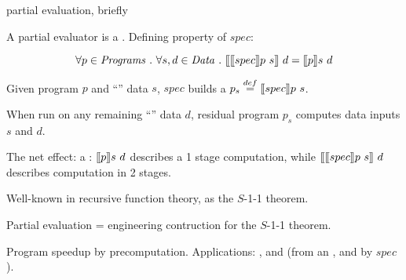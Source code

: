 \documentclass[12pt,fleqn,landscape]{article}
\begin{document}
\begin{slide}{partial evaluation, briefly}

A partial evaluator is a . Defining property of $spec$:

$$
\forall p\in \mathit{Programs}\ .\ \forall s, d \in \mathit{Data}\ . \ 
\lsem \lsem spec\rsem p\ s\rsem\ d = \lsem p\rsem s \ d
$$
\smallskip

\bi

\item Given program $p$ and ``'' data $s$, $\mathit{spec}$ builds a  $p_s \stackrel{def}{=} \mbox{$\lbrack\hspace{-0.3ex}\lbrack$} spec\mbox{$\rbrack\hspace{-0.3ex}\rbrack$} p\ s$. 

\item When run on any remaining ``'' data $d$, residual program $p_s$ computes  data inputs $s$ and $d$.

\item The net effect: a :  $\lsem p\rsem s \ d$ describes a 1 stage computation, while $\mbox{$\lbrack\hspace{-0.3ex}\lbrack$} \mbox{$\lbrack\hspace{-0.3ex}\lbrack$} spec\mbox{$\rbrack\hspace{-0.3ex}\rbrack$} p\ s\mbox{$\rbrack\hspace{-0.3ex}\rbrack$}\ d$ describes computation in 2 stages.

 \hfill {}

\item Well-known in recursive function theory, as the $S$-1-1 theorem.

\item Partial evaluation = engineering contruction for the $S$-1-1 theorem.

\item Program speedup by precomputation.
Applications: , and  (from an ,
and by \vertt{self-applying}  $\mathit{spec}$).


\ei
\end{slide}

\end{document}
